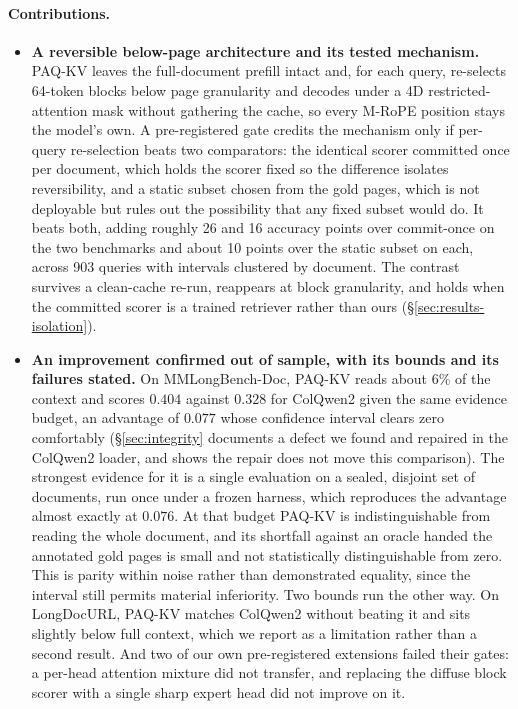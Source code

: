 \documentclass[letterpaper]{article} %
\newcommand{\paqc}{\textsc{PAQ-KV}}
\begin{document}
\paragraph{Contributions.}
\begin{itemize}
\item \textbf{A reversible below-page architecture and its tested mechanism.}
\paqc{} leaves the full-document prefill intact and, for each query, re-selects
64-token blocks below page granularity and decodes under a 4D
restricted-attention mask without gathering the cache, so every M-RoPE position
stays the model's own. A pre-registered gate credits the mechanism only if
per-query re-selection beats two comparators: the identical scorer committed once
per document, which holds the scorer fixed so the difference isolates
reversibility, and a static subset chosen from the gold pages, which is not
deployable but rules out the possibility that any fixed subset would do. It beats
both, adding roughly 26 and 16 accuracy points over commit-once on the two
benchmarks and about 10 points over the static subset on each, across 903 queries
with intervals clustered by document. The contrast survives a clean-cache re-run,
reappears at block granularity, and holds when the committed scorer is a trained
retriever rather than ours (\S\ref{sec:results-isolation}).
\item \textbf{An improvement confirmed out of sample, with its bounds and its
failures stated.} On MMLongBench-Doc, \paqc{} reads about 6\% of the context and
scores $0.404$ against $0.328$ for ColQwen2 given the same evidence budget, an
advantage of $0.077$ whose confidence interval clears zero comfortably
(\S\ref{sec:integrity} documents a defect we found and repaired in the ColQwen2
loader, and shows the repair does not move this comparison). The strongest
evidence for it is a single evaluation on a sealed, disjoint set of documents,
run once under a frozen harness, which reproduces the advantage almost exactly at
$0.076$. At that budget \paqc{} is indistinguishable from reading the whole
document, and its shortfall against an oracle handed the annotated gold pages is
small and not statistically distinguishable from zero. This is parity within
noise rather than demonstrated equality, since the interval still permits
material inferiority. Two bounds run the other way. On LongDocURL, \paqc{}
matches ColQwen2 without beating it and sits slightly below full context, which we
report as a limitation rather than a second result. And two of our own
pre-registered extensions failed their gates: a per-head attention mixture did
not transfer, and replacing the diffuse block scorer with a single sharp expert
head did not improve on it.
\end{itemize}
\end{document}
